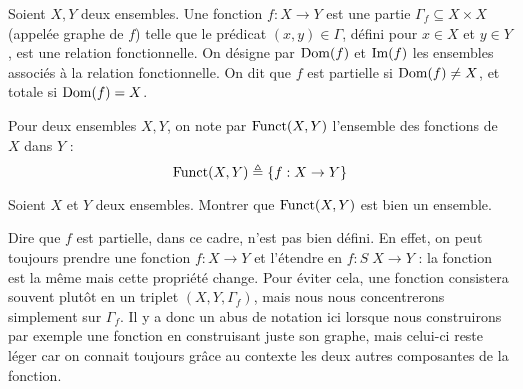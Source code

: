 \begin{definition}[Fonction]
  Soient $X,Y$ deux ensembles. Une fonction $f : X \to Y$ est une partie
  $\Gamma_f\subseteq X \times X$ (appelée graphe de $f$)  telle que le prédicat
  $(x,y)\in \Gamma$, défini pour $x\in X$ et $y\in Y$, est une relation
  fonctionnelle. On désigne par $\operatorname{Dom}(f)$ et $\operatorname{Im}(f)$ les ensembles associés à
  la relation fonctionnelle. On dit que $f$ est partielle si $\operatorname{Dom}(f) \neq X$,
  et totale si $\operatorname{Dom}(f) = X$.

  Pour deux ensembles $X,Y$, on note par $\operatorname{Funct}(X,Y)$ l'ensemble des fonctions
  de $X$ dans $Y$ :
  \[\operatorname{Funct}(X,Y) \triangleq \{f : X \to Y\}\]
\end{definition}

\begin{exercise}
  Soient $X$ et $Y$ deux ensembles. Montrer que $\operatorname{Funct}(X,Y)$ est bien un
  ensemble.
\end{exercise}

\begin{remark}
  Dire que $f$ est partielle, dans ce cadre, n'est pas bien défini. En effet, on
  peut toujours prendre une fonction $f : X \to Y$ et l'étendre en
  $f : S\;X \to Y$ : la fonction est la même mais cette propriété change. Pour
  éviter cela, une fonction consistera souvent plutôt en un triplet
  $(X,Y,\Gamma_f)$, mais nous nous concentrerons simplement sur $\Gamma_f$. Il y
  a donc un abus de notation ici lorsque nous construirons par exemple une
  fonction en construisant juste son graphe, mais celui-ci reste léger car on
  connait toujours grâce au contexte les deux autres composantes de la fonction.
\end{remark}

